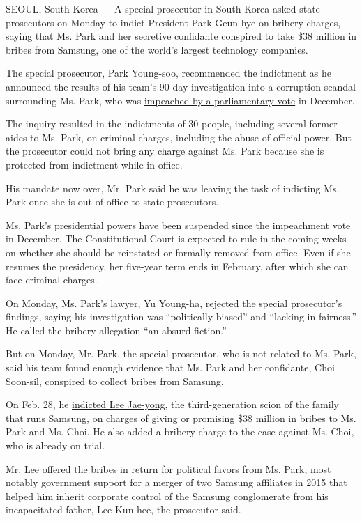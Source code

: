 SEOUL, South Korea --- A special prosecutor in South Korea asked state
prosecutors on Monday to indict President Park Geun-hye on bribery
charges, saying that Ms. Park and her secretive confidante conspired to
take \$38 million in bribes from Samsung, one of the world's largest
technology companies.

The special prosecutor, Park Young-soo, recommended the indictment as he
announced the results of his team's 90-day investigation into a
corruption scandal surrounding Ms. Park, who was
\href{https://www.nytimes3xbfgragh.onion/2016/12/09/world/asia/south-korea-president-park-geun-hye-impeached.html}{impeached
by a parliamentary vote} in December.

The inquiry resulted in the indictments of 30 people, including several
former aides to Ms. Park, on criminal charges, including the abuse of
official power. But the prosecutor could not bring any charge against
Ms. Park because she is protected from indictment while in office.

His mandate now over, Mr. Park said he was leaving the task of indicting
Ms. Park once she is out of office to state prosecutors.

Ms. Park's presidential powers have been suspended since the impeachment
vote in December. The Constitutional Court is expected to rule in the
coming weeks on whether she should be reinstated or formally removed
from office. Even if she resumes the presidency, her five-year term ends
in February, after which she can face criminal charges.

On Monday, Ms. Park's lawyer, Yu Young-ha, rejected the special
prosecutor's findings, saying his investigation was ``politically
biased'' and ``lacking in fairness.'' He called the bribery allegation
``an absurd fiction.''

But on Monday, Mr. Park, the special prosecutor, who is not related to
Ms. Park, said his team found enough evidence that Ms. Park and her
confidante, Choi Soon-sil, conspired to collect bribes from Samsung.

On Feb. 28, he
\href{https://www.nytimes3xbfgragh.onion/2017/02/28/world/asia/lee-jae-yong-samsung.html}{indicted
Lee Jae-yong}, the third-generation scion of the family that runs
Samsung, on charges of giving or promising \$38 million in bribes to Ms.
Park and Ms. Choi. He also added a bribery charge to the case against
Ms. Choi, who is already on trial.

Mr. Lee offered the bribes in return for political favors from Ms. Park,
most notably government support for a merger of two Samsung affiliates
in 2015 that helped him inherit corporate control of the Samsung
conglomerate from his incapacitated father, Lee Kun-hee, the prosecutor
said.

